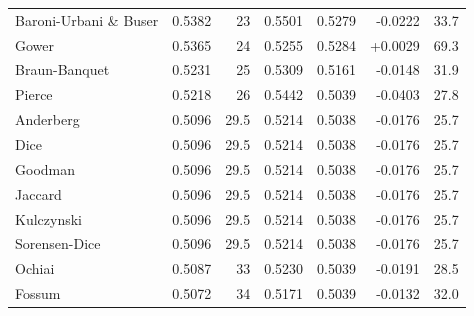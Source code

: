 \begin{table}[t]
{\begin{tabular}{lrrrrrr}
Baroni-Urbani \& Buser & 0.5382 & 23 & 0.5501 & 0.5279 & -0.0222 & 33.7 \\
Gower & 0.5365 & 24 & 0.5255 & 0.5284 & +0.0029 & 69.3 \\
Braun-Banquet & 0.5231 & 25 & 0.5309 & 0.5161 & -0.0148 & 31.9 \\
Pierce & 0.5218 & 26 & 0.5442 & 0.5039 & -0.0403 & 27.8 \\
Anderberg & 0.5096 & 29.5 & 0.5214 & 0.5038 & -0.0176 & 25.7 \\
Dice & 0.5096 & 29.5 & 0.5214 & 0.5038 & -0.0176 & 25.7 \\
Goodman & 0.5096 & 29.5 & 0.5214 & 0.5038 & -0.0176 & 25.7 \\
Jaccard & 0.5096 & 29.5 & 0.5214 & 0.5038 & -0.0176 & 25.7 \\
Kulczynski & 0.5096 & 29.5 & 0.5214 & 0.5038 & -0.0176 & 25.7 \\
Sorensen-Dice & 0.5096 & 29.5 & 0.5214 & 0.5038 & -0.0176 & 25.7 \\
Ochiai & 0.5087 & 33 & 0.5230 & 0.5039 & -0.0191 & 28.5 \\
Fossum & 0.5072 & 34 & 0.5171 & 0.5039 & -0.0132 & 32.0 \\
\bottomrule
\end{tabular}
}
\end{table}
